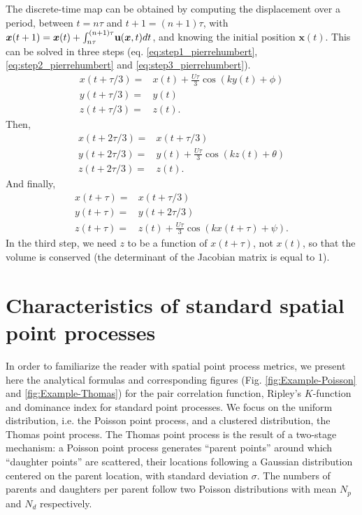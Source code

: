 \documentclass[english]{article}
\newcommand{\bx}{\boldsymbol{x}}
\begin{document}
The discrete-time map can be obtained by computing the displacement
over a period, between $t=n\tau$ and $t+1=(n+1)\tau$, with $\bx(t+1)=\bx(t)+\textbf{\ensuremath{\int_{n\tau}^{\left(n+1\right)\tau}}u}(\bx,t)dt$,
and knowing the initial position $\mathbf{x}(t)$. This can be solved
in three steps (eq. \ref{eq:step1_pierrehumbert}, \ref{eq:step2_pierrehumbert}
and \ref{eq:step3_pierrehumbert}).
\begin{equation}
\begin{array}{cc}
x(t+\tau/3)= & x(t)+\frac{U\tau}{3}\cos(ky(t)+\phi)\\
y(t+\tau/3)= & y(t)\\
z(t+\tau/3)= & z(t).
\end{array}\label{eq:step1_pierrehumbert}
\end{equation}
Then,
\begin{equation}
\begin{array}{cc}
x(t+2\tau/3)= & x(t+\tau/3)\\
y(t+2\tau/3)= & y(t)+\frac{U\tau}{3}\cos(kz(t)+\theta)\\
z(t+2\tau/3)= & z(t).
\end{array}\label{eq:step2_pierrehumbert}
\end{equation}
And finally,
\begin{equation}
\begin{array}{cc}
x(t+\tau)= & x(t+\tau/3)\\
y(t+\tau)= & y(t+2\tau/3)\\
z(t+\tau)= & z(t)+\frac{U\tau}{3}\cos(kx(t+\tau)+\psi).
\end{array}\label{eq:step3_pierrehumbert}
\end{equation}
In the third step, we need $z$ to be a function of $x(t+\tau)$,
not $x(t)$, so that the volume is conserved (the determinant of the
Jacobian matrix is equal to 1).

\section{Characteristics of standard spatial point processes}

In order to familiarize the reader with spatial point process metrics,
we present here the analytical formulas and corresponding figures
(Fig. \ref{fig:Example-Poisson} and \ref{fig:Example-Thomas}) for
the pair correlation function, Ripley's $K$-function and dominance
index for standard point processes. We focus on the uniform distribution,
i.e. the Poisson point process, and a clustered distribution, the
Thomas point process. The Thomas point process is the result of a
two-stage mechanism: a Poisson point process generates ``parent points''
around which ``daughter points'' are scattered, their locations
following a Gaussian distribution centered on the parent location,
with standard deviation $\sigma$. The numbers of parents and daughters
per parent follow two Poisson distributions with mean $N_{p}$ and
$N_{d}$ respectively.
\end{document}
